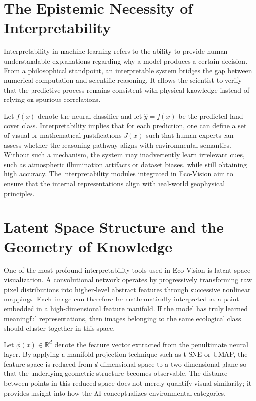 \documentclass[12pt,a4paper]{report}
\begin{document}
\section{The Epistemic Necessity of Interpretability}

Interpretability in machine learning refers to the ability to provide human-understandable explanations regarding why a model produces a certain decision. From a philosophical standpoint, an interpretable system bridges the gap between numerical computation and scientific reasoning. It allows the scientist to verify that the predictive process remains consistent with physical knowledge instead of relying on spurious correlations.

Let \( f(x) \) denote the neural classifier and let \( \hat{y} = f(x) \) be the predicted land cover class. Interpretability implies that for each prediction, one can define a set of visual or mathematical justifications \( J(x) \) such that human experts can assess whether the reasoning pathway aligns with environmental semantics. Without such a mechanism, the system may inadvertently learn irrelevant cues, such as atmospheric illumination artifacts or dataset biases, while still obtaining high accuracy. The interpretability modules integrated in Eco-Vision aim to ensure that the internal representations align with real-world geophysical principles.

\section{Latent Space Structure and the Geometry of Knowledge}

One of the most profound interpretability tools used in Eco-Vision is latent space visualization. A convolutional network operates by progressively transforming raw pixel distributions into higher-level abstract features through successive nonlinear mappings. Each image can therefore be mathematically interpreted as a point embedded in a high-dimensional feature manifold. If the model has truly learned meaningful representations, then images belonging to the same ecological class should cluster together in this space.

Let \( \phi(x) \in \mathbb{R}^d \) denote the feature vector extracted from the penultimate neural layer. By applying a manifold projection technique such as t-SNE or UMAP, the feature space is reduced from \(d\)-dimensional space to a two-dimensional plane so that the underlying geometric structure becomes observable. The distance between points in this reduced space does not merely quantify visual similarity; it provides insight into how the AI conceptualizes environmental categories.
\end{document}
